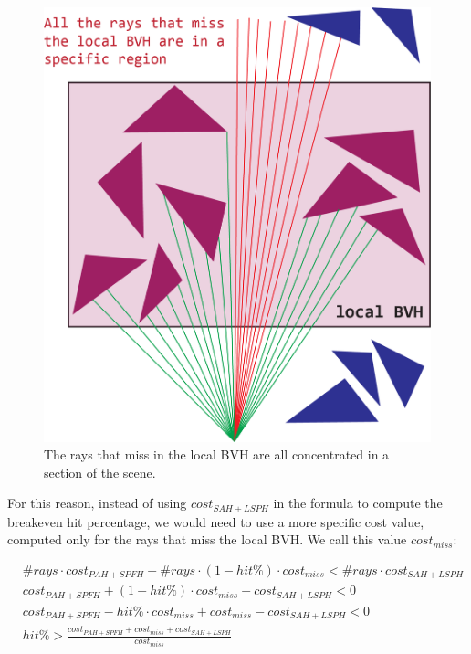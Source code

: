\documentclass{PoliMi_MasterThesis}
\begin{document}
\begin{figure}[H] 
	\centering
	\includegraphics[width=\textwidth*\real{0.45}]{Images/local_missing_rays.png}
	\caption{The rays that miss in the local BVH are all concentrated in a section of the scene.}
	\label{fig:ray_missing_local}
\end{figure}

For this reason, instead of using $cost_{SAH+LSPH}$ in the formula to compute the breakeven hit percentage, we would need to use a more specific cost value, computed only for the rays that miss the local BVH. We call this value $cost_{miss}$:

\begin{subequations}
	\begin{align*}
		&\#rays \cdot cost_{PAH+SPFH} + \#rays \cdot (1-hit\%) \cdot cost_{miss} < \#rays \cdot cost_{SAH+LSPH}\\
		&cost_{PAH+SPFH} + (1-hit\%) \cdot cost_{miss} - cost_{SAH+LSPH} < 0\\
		&cost_{PAH+SPFH} - hit\% \cdot cost_{miss} + cost_{miss} - cost_{SAH+LSPH} < 0\\
		&hit\% > \frac{cost_{PAH+SPFH} + cost_{miss} + cost_{SAH+LSPH}}{cost_{miss}}
	\end{align*}
\end{subequations}
\end{document}
